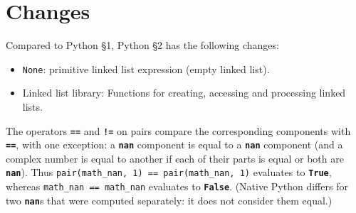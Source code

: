 





\section{Changes}

Compared to Python \S 1, Python \S 2 has the following changes:
\begin{itemize}
  \item \lstinline{None}: primitive linked list expression (empty linked list).
  \item Linked list library: Functions for creating, accessing and
    processing linked lists.
\end{itemize}



















The operators \texttt{\textbf{==}} and \texttt{\textbf{!=}} on pairs compare the corresponding
components with \texttt{\textbf{==}}, with one exception: a \texttt{\textbf{nan}} component is
equal to a \texttt{\textbf{nan}} component (and a complex number is equal to another if each of
their parts is equal or both are \texttt{\textbf{nan}}). Thus
\texttt{pair(math\_nan, 1) == pair(math\_nan, 1)} evaluates to \texttt{\textbf{True}},
whereas \texttt{math\_nan == math\_nan} evaluates to \texttt{\textbf{False}}. (Native Python differs
for two \texttt{\textbf{nan}}s that were computed separately: it does not consider them equal.)












